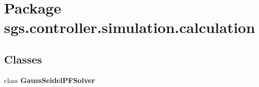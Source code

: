 \section{Package sgs.\-controller.\-simulation.\-calculation}
\label{namespacesgs_1_1controller_1_1simulation_1_1calculation}
\subsection*{Classes}
\begin{DoxyCompactItemize}
\item 
class {\bf Gauss\-Seidel\-P\-F\-Solver}
\end{DoxyCompactItemize}
